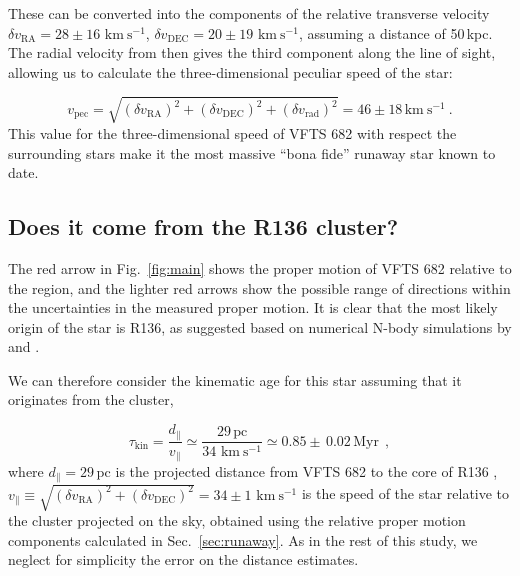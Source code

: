 \documentclass[apjl,twocolumn]{emulateapj}
\newcommand{\kms}{{\,\mathrm{km\ s^{-1}}}}
\DeclareRobustCommand{\Figref}[1]{Fig.~\ref{#1}}
\DeclareRobustCommand{\Secref}[1]{Sec.~\ref{#1}}
\begin{document}
These can be converted into
the components of the relative transverse velocity $\delta v_\mathrm{RA}=28\pm16\,\kms$,
$\delta v_\mathrm{DEC}=20\pm19\,\kms$, assuming a distance of
50\,kpc. %
The radial velocity from
\cite{bestenlehner:11} then gives the third component along
the line of sight, allowing us to calculate the three-dimensional
peculiar speed of the star:

\begin{equation}
  \label{eq:speed_around}
  v_\mathrm{pec} = \sqrt{\left(\delta v_\mathrm{RA}\right)^2
    +\left(\delta v_\mathrm{DEC}\right)^2+\left(\delta
      v_\mathrm{rad}\right)^2} = 46 \pm 18 
  \kms \ .
\end{equation}
This value for the three-dimensional speed of VFTS 682 with respect the
surrounding stars make it the most massive ``bona fide'' runaway star
known to date.

\subsection{Does it come from the R136 cluster?}
\label{sec:r136_origin}

The red arrow in \Figref{fig:main} shows the proper motion of VFTS 682
relative to the region, and the lighter red arrows show the possible
range of directions within the uncertainties in the measured proper
motion. It is clear that the most likely origin of the star is R136,
as suggested based on numerical N-body simulations by \cite{fujii:11}
and \cite{banerjee:12}.

We can therefore consider the kinematic age for this star assuming
that it originates from the cluster,

\begin{equation}
  \label{eq:kin_age}
  \tau_\mathrm{kin} = \frac{d_\parallel}{v_\parallel} \simeq
  \frac{29\,\mathrm{pc}}{34\,\kms} \simeq 0.85\pm\,0.02\, \mathrm{Myr} \ \ ,
\end{equation}
where $d_\parallel =29$\,pc is the projected distance from VFTS 682 to
the core of R136 \citep[][]{bestenlehner:11}, $v_\parallel \equiv \sqrt{\left(\delta v_\mathrm{RA}\right)^2
    +\left(\delta v_\mathrm{DEC}\right)^2} =34\pm
1\,\kms$ is the speed of the star relative to the cluster projected on the sky, obtained
using the relative proper motion components calculated in
\Secref{sec:runaway}.%
As in the rest of this study, we neglect for
simplicity the error on the distance estimates.
\end{document}
